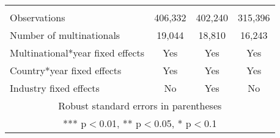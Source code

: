 \begin{longtable}{lccc}
 &  &  &  \\
Observations & 406,332 & 402,240 & 315,396 \\
Number of multinationals & 19,044 & 18,810 & 16,243 \\
Multinational*year fixed effects & Yes & Yes & Yes \\
 Country*year fixed effects & Yes & Yes & Yes \\ 
  Industry fixed effects & No & Yes & No \\\hline
\multicolumn{4}{c}{ Robust standard errors in parentheses} \\
\multicolumn{4}{c}{ *** p$<$0.01, ** p$<$0.05, * p$<$0.1} \\
\end{longtable}
